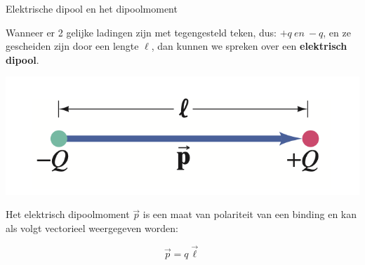 \begin{theo}{Elektrische dipool en het dipoolmoment}

    Wanneer er 2 gelijke ladingen zijn met tegengesteld teken, dus: $ +q \ en \ -q $, en ze gescheiden zijn door een lengte $ \ell $, dan kunnen we spreken over een \textbf{elektrisch dipool}. \\
    \begin{center}
       \includegraphics[scale = 0.4]{Images/Elektriciteit/Dipool.png} 
    \end{center}
    Het elektrisch dipoolmoment $ \vec{p} $ is een maat van polariteit van een binding en kan als volgt vectorieel weergegeven worden: 
    
    \begin{equation*}
        \Vec{p} = q\Vec{\ell}
    \end{equation*}
\end{theo}

